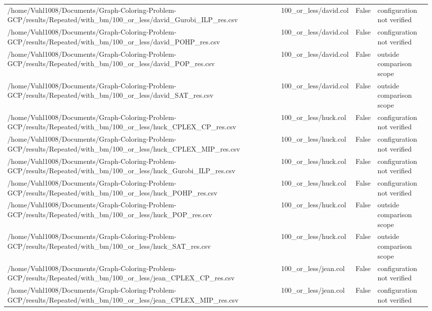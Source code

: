 \begin{table}[htbp]
\begin{tabular}{llll}
/home/Vuhl1008/Documents/Graph-Coloring-Problem-GCP/results/Repeated/with\_bm/100\_or\_less/david\_Gurobi\_ILP\_res.csv & 100\_or\_less/david.col & False & configuration not verified \\
/home/Vuhl1008/Documents/Graph-Coloring-Problem-GCP/results/Repeated/with\_bm/100\_or\_less/david\_POHP\_res.csv & 100\_or\_less/david.col & False & configuration not verified \\
/home/Vuhl1008/Documents/Graph-Coloring-Problem-GCP/results/Repeated/with\_bm/100\_or\_less/david\_POP\_res.csv & 100\_or\_less/david.col & False & outside comparison scope \\
/home/Vuhl1008/Documents/Graph-Coloring-Problem-GCP/results/Repeated/with\_bm/100\_or\_less/david\_SAT\_res.csv & 100\_or\_less/david.col & False & outside comparison scope \\
/home/Vuhl1008/Documents/Graph-Coloring-Problem-GCP/results/Repeated/with\_bm/100\_or\_less/huck\_CPLEX\_CP\_res.csv & 100\_or\_less/huck.col & False & configuration not verified \\
/home/Vuhl1008/Documents/Graph-Coloring-Problem-GCP/results/Repeated/with\_bm/100\_or\_less/huck\_CPLEX\_MIP\_res.csv & 100\_or\_less/huck.col & False & configuration not verified \\
/home/Vuhl1008/Documents/Graph-Coloring-Problem-GCP/results/Repeated/with\_bm/100\_or\_less/huck\_Gurobi\_ILP\_res.csv & 100\_or\_less/huck.col & False & configuration not verified \\
/home/Vuhl1008/Documents/Graph-Coloring-Problem-GCP/results/Repeated/with\_bm/100\_or\_less/huck\_POHP\_res.csv & 100\_or\_less/huck.col & False & configuration not verified \\
/home/Vuhl1008/Documents/Graph-Coloring-Problem-GCP/results/Repeated/with\_bm/100\_or\_less/huck\_POP\_res.csv & 100\_or\_less/huck.col & False & outside comparison scope \\
/home/Vuhl1008/Documents/Graph-Coloring-Problem-GCP/results/Repeated/with\_bm/100\_or\_less/huck\_SAT\_res.csv & 100\_or\_less/huck.col & False & outside comparison scope \\
/home/Vuhl1008/Documents/Graph-Coloring-Problem-GCP/results/Repeated/with\_bm/100\_or\_less/jean\_CPLEX\_CP\_res.csv & 100\_or\_less/jean.col & False & configuration not verified \\
/home/Vuhl1008/Documents/Graph-Coloring-Problem-GCP/results/Repeated/with\_bm/100\_or\_less/jean\_CPLEX\_MIP\_res.csv & 100\_or\_less/jean.col & False & configuration not verified \\

\end{tabular}
\end{table}
